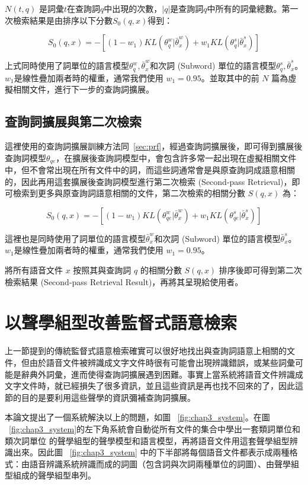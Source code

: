 $N(t, q)$ 是詞彙$t$在查詢詞$q$中出現的次數，$|q|$是查詢詞$q$中所有的詞彙總數。第一次檢索結果是由排序以下分數$S_0(q, x)$得到：

\begin{equation}
\label{equ:chap3_fpr}
S_0(q, x) = -[(1-w_1)KL(\theta_q^{w}|\bar{\theta}_x^{w}) + w_1KL(\theta_q^{s}|\bar{\theta}_x^{s})]
\end{equation}

上式同時使用了詞單位的語言模型$\theta_q^w, \bar{\theta}_x^{w}$和次詞 (Subword) 單位的語言模型$\theta_q^{s}, \bar{\theta}_x^{s}$。$w_1$是線性疊加兩者時的權重，通常我們使用 $w_1 = 0.95$。並取其中的前 $N$ 篇為虛擬相關文件，進行下一步的查詢詞擴展。

\subsection{查詢詞擴展與第二次檢索}
這裡使用的查詢詞擴展訓練方法同~\ref{sec:prf}，經過查詢詞擴展後，即可得到擴展後查詢詞模型$\theta_{qe}$，在擴展後查詢詞模型中，會包含許多常一起出現在虛擬相關文件中，但不會常出現在所有文件中的詞，而這些詞通常會是與原查詢詞成語意相關的，因此再用這套擴展後查詢詞模型進行第二次檢索 (Second-pass Retrieval)，即可檢索到更多與原查詢詞語意相關的文件，第二次檢索的相關分數 $S(q, x)$ 為：

\begin{equation}
S_0(q, x) = -[(1-w_1)KL(\theta_{qe}^{w}|\bar{\theta}_x^{w}) + w_1KL(\theta_{qe}^{s}|\bar{\theta}_x^{s})]
\end{equation}

這裡也是同時使用了詞單位的語言模型$\bar{\theta}_x^{w}$和次詞 (Subword) 單位的語言模型$\bar{\theta}_x^{s}$。$w_1$是線性疊加兩者時的權重，通常我們使用 $w_1 = 0.95$。

將所有語音文件 $x$ 按照其與查詢詞 $q$ 的相關分數 $S(q, x)$ 排序後即可得到第二次檢索結果 (Second-pass Retrieval Result)，再將其呈現給使用者。

\section{以聲學組型改善監督式語意檢索}
上一節提到的傳統監督式語意檢索確實可以很好地找出與查詢詞語意上相關的文件，但由於語音文件被辨識成文字文件時很有可能會出現辨識錯誤，或某些詞彙可能是辭典外詞彙，進而使得查詢詞擴展遇到困難。事實上當系統將語音文件辨識成文字文件時，就已經損失了很多資訊，並且這些資訊是再也找不回來的了，因此這節的目的是要利用這些聲學的資訊彌補查詢詞擴展。

本論文提出了一個系統解決以上的問題，如圖 ~\ref{fig:chap3_system}。在圖 ~\ref{fig:chap3_system}的左下角系統會自動從所有文件的集合中學出一套類詞單位和類次詞單位 的聲學組型的聲學模型和語言模型，再將語音文件用這套聲學組型辨識出來。因此圖 ~\ref{fig:chap3_system} 中的下半部將每個語音文件都表示成兩種格式：由語音辨識系統辨識而成的詞圖（包含詞與次詞兩種單位的詞圖）、由聲學組型組成的聲學組型串列。

